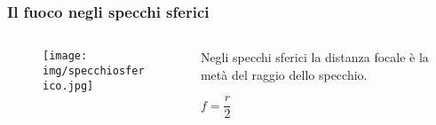 \documentclass[]{beamer}
\theoremstyle{plain}
\begin{document}
\begin{frame}
\frametitle{Il fuoco negli specchi sferici}
\begin{columns}
\begin{column}{0.45\textwidth}
\begin{figure}
\texttt{[image: img/specchiosferico.jpg]}
\end{figure}
\end{column}
\begin{column}{0.5\textwidth}
Negli specchi sferici \alert<1>{la distanza focale è la metà del raggio} dello specchio.
\begin{center}
\colorbox{blue!30}{$ f = \dfrac{r}{2} $}
\end{center}
\end{column}
\end{columns}
\end{frame}
\end{document}
